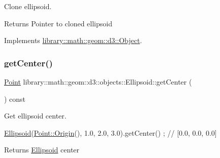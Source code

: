 Clone ellipsoid. 

\begin{DoxyReturn}{Returns}
Pointer to cloned ellipsoid 
\end{DoxyReturn}


Implements \hyperlink{classlibrary_1_1math_1_1geom_1_1d3_1_1_object_a1a784c6b359e0eb97cd34fabc42f2f3f}{library\+::math\+::geom\+::d3\+::\+Object}.

\mbox{\label{classlibrary_1_1math_1_1geom_1_1d3_1_1objects_1_1_ellipsoid_a646be2506950d250db0fb6610979bb46}} 
\subsubsection{\texorpdfstring{get\+Center()}{getCenter()}}
{\footnotesize\ttfamily \hyperlink{classlibrary_1_1math_1_1geom_1_1d3_1_1objects_1_1_point}{Point} library\+::math\+::geom\+::d3\+::objects\+::\+Ellipsoid\+::get\+Center (\begin{DoxyParamCaption}{ }\end{DoxyParamCaption}) const}



Get ellipsoid center. 


\begin{DoxyCode}
\hyperlink{classlibrary_1_1math_1_1geom_1_1d3_1_1objects_1_1_ellipsoid_aae81fe0edc7f0e8d4590ea89ae73cb14}{Ellipsoid}(\hyperlink{classlibrary_1_1math_1_1geom_1_1d3_1_1objects_1_1_point_ab2a38e285c562e50bf350272c083986f}{Point::Origin}(), 1.0, 2.0, 3.0).getCenter() ; \textcolor{comment}{// [0.0, 0.0, 0.0]}
\end{DoxyCode}


\begin{DoxyReturn}{Returns}
\hyperlink{classlibrary_1_1math_1_1geom_1_1d3_1_1objects_1_1_ellipsoid}{Ellipsoid} center 
\end{DoxyReturn}
\mbox{\label{classlibrary_1_1math_1_1geom_1_1d3_1_1objects_1_1_ellipsoid_a8219b05b4c6afcd71e915d10b6129baf}} 
